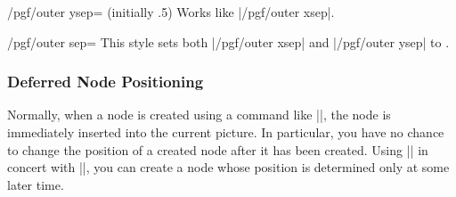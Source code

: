 \begin{key}{/pgf/outer ysep= (initially .5\string\pgflinewidth)}
  Works like |/pgf/outer xsep|.
\end{key}

\begin{key}{/pgf/outer sep=}
  This style sets both |/pgf/outer xsep| and |/pgf/outer ysep| to .
\end{key}


\subsubsection{Deferred Node Positioning}

Normally, when a node is created using a command like |\pgfnode|, the
node is immediately inserted into the current picture. In particular,
you have no chance to change the position of a created node after it
has been created. Using |\pgfpositionnodelater| in concert with
|\pgfpositionnodenow|, you can create a node whose position is
determined only at some later time.

